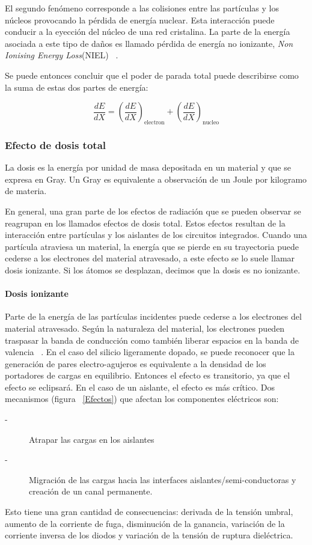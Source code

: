 \documentclass[a4paper,openright,12pt]{report}
\begin{document}
El segundo fenómeno corresponde a las colisiones entre las partículas y los núcleos provocando la pérdida de energía nuclear. Esta interacción puede conducir a la eyección del núcleo de una red cristalina. La parte de la energía asociada a este tipo de daños es llamado pérdida de energía no ionizante,  \textit{Non Ionising Energy Loss}(NIEL) ~\cite{316523}.

Se puede entonces concluir que el poder de parada total puede describirse como la suma de estas dos partes de energía:

\begin{equation}\label{EQ1}
\frac{dE}{dX}=\left(\frac{dE}{dX}\right)_\text{electron}+\left(\frac{dE}{dX}\right)_\text{nucleo}
\end{equation}

\subsubsection{Efecto de dosis total}

La dosis es la energía por unidad de masa depositada en un material y que se expresa en Gray. Un Gray es equivalente a observación de un Joule por kilogramo de materia.

En general, una gran parte de los efectos de radiación que se pueden observar se  reagrupan en los llamados efectos de dosis total. Estos efectos resultan de la interacción entre partículas y los aislantes de los circuitos integrados. Cuando una partícula atraviesa un material, la energía que se pierde en su trayectoria puede cederse a los electrones del material atravesado, a este efecto se lo suele llamar dosis ionizante. Si los átomos se  desplazan, decimos que la dosis es no ionizante.


\paragraph{Dosis ionizante}\hfill \break
 
Parte de la energía de las partículas incidentes puede cederse a los electrones del material atravesado. Según la naturaleza del material, los electrones pueden traspasar la banda de conducción como también liberar espacios en la banda de valencia ~\cite{1208572}. En el caso del silicio ligeramente dopado, se puede reconocer que la generación de pares electro-agujeros es equivalente a la densidad de los portadores de cargas en equilibrio. Entonces el efecto es transitorio, ya que el efecto se eclipsará. En el caso de un aislante, el efecto es más crítico. Dos mecanismos (figura ~\ref{Efectos}) que afectan los componentes eléctricos son:
\begin{description}
\item[-] Atrapar las cargas en los aislantes  
\item[-] Migración de las cargas hacia las interfaces aislantes/semi-conductoras y creación de un canal permanente.

\end{description}
Esto tiene una gran cantidad de consecuencias: derivada de la tensión umbral, aumento de la corriente de fuga, disminución de la ganancia, variación de la corriente inversa de los diodos y variación de la tensión de ruptura dieléctrica.
\end{document}
